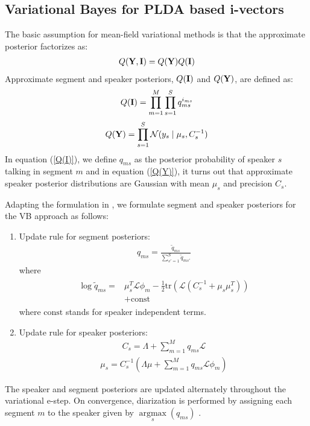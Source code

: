 \documentclass{article}
\begin{document}
\subsection{Variational Bayes for PLDA based i-vectors}
\label{vb_for_PLDA_ivec}

The basic assumption for mean-field variational methods is that the approximate posterior factorizes as:
\begin{eqnarray}
\label{Q_fact}
Q({\bf Y},{\bf I})=Q({\bf Y})Q({\bf I})
\end{eqnarray}
Approximate segment and speaker posteriors, $Q({\bf I})$ and $Q({\bf Y})$, are defined as:
\begin{eqnarray}
\label{Q(I)}
Q({\bf I}) = \prod_{m=1}^{M} \prod_{s=1}^{S}q_{ms}^{i_{ms}}
\end{eqnarray}
\begin{eqnarray}
Q({\bf Y}) = \prod_{s=1}^{S}\mathcal{N}(y_s\mid \mu_s,C_s^{-1})
\label{Q(Y)}
\end{eqnarray}
In equation (\ref{Q(I)}), we define $q_{ms}$ as the posterior probability of speaker $s$ talking in segment $m$ and in equation (\ref{Q(Y)}), it turns out that approximate speaker posterior distributions are Gaussian with mean $\mu_s$ and precision $C_s$.

Adapting the formulation in \cite{kenny2008BAdiar}, we formulate segment and speaker posteriors for the VB approach as follows:
\begin{enumerate}
\item Update rule for segment posteriors:
\begin{eqnarray}
q_{ms}=\frac{\tilde{q}_{ms}}{\sum_{s'=1}^{S}\tilde{q}_{ms'}}
\label{q_ms_norm}
\end{eqnarray}
where
\begin{eqnarray}
\begin{split}
\log \tilde{q}_{ms}= &\mu_s^T\mathcal{L}\phi_m-\frac{1}{2}\mathrm{tr}(\mathcal{L}(C_s^{-1}+\mu_s\mu_s^T)) \\
                     &+\mbox{const}
\end{split}
\label{q_ms}
\end{eqnarray}
where $\mbox{const}$ stands for speaker independent terms.

\item Update rule for speaker posteriors:
\begin{eqnarray}
C_s=\Lambda+\sum_{m=1}^{M}q_{ms}\mathcal{L}
\label{C_s}
\end{eqnarray}
\begin{eqnarray}
\mu_s=C_s^{-1}(\Lambda\mu+\sum_{m=1}^{M}q_{ms}\mathcal{L}\phi_m)
\label{mu_s}
\end{eqnarray}
\end{enumerate}
\newpage
The speaker and segment posteriors are updated alternately throughout the variational e-step. On convergence, diarization is performed by assigning each segment $m$ to the speaker given by $\underset{s}{\operatorname{argmax}} ( q_{ms})$ \cite{kenny2010diarFA}.
\end{document}
